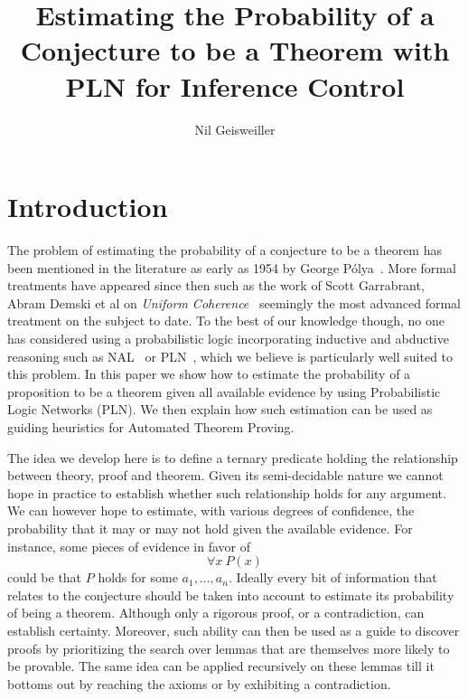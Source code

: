 \documentclass{easychair}
\title{Estimating the Probability of a Conjecture to be a Theorem with
  PLN for Inference Control}
\author{Nil Geisweiller}
\institute{
  SingularityNET Foundation,\\
  Zug, Switzerland\\
  \email{nil@singularitynet.io}
}
\begin{document}
\maketitle


\section{Introduction}

The problem of estimating the probability of a conjecture to be a
theorem has been mentioned in the literature as early as 1954 by
George P\'olya~\cite{Polya1954}.  More formal treatments have appeared
since then such as the work of Scott Garrabrant, Abram Demski et al on
\emph{Uniform Coherence}~\cite{Garrabrant2016, Abram2016} seemingly
the most advanced formal treatment on the subject to date.  To the
best of our knowledge though, no one has considered using a
probabilistic logic incorporating inductive and abductive reasoning
such as NAL~\cite{Wang2013} or PLN~\cite{Goertzel09PLN}, which we
believe is particularly well suited to this problem.  In this paper we
show how to estimate the probability of a proposition to be a theorem
given all available evidence by using Probabilistic Logic Networks
(PLN).  We then explain how such estimation can be used as guiding
heuristics for Automated Theorem Proving.

The idea we develop here is to define a ternary predicate holding the
relationship between theory, proof and theorem.  Given its
semi-decidable nature we cannot hope in practice to establish whether
such relationship holds for any argument.  We can however hope to
estimate, with various degrees of confidence, the probability that it
may or may not hold given the available evidence.  For instance, some
pieces of evidence in favor of
$$\forall x \ P(x)$$ could be that $P$ holds for some $a_1, \dots,
a_n$.  Ideally every bit of information that relates to the conjecture
should be taken into account to estimate its probability of being a
theorem.  Although only a rigorous proof, or a contradiction, can
establish certainty.  Moreover, such ability can then be used as a
guide to discover proofs by prioritizing the search over lemmas that
are themselves more likely to be provable.  The same idea can be
applied recursively on these lemmas till it bottoms out by reaching
the axioms or by exhibiting a contradiction.
\end{document}
